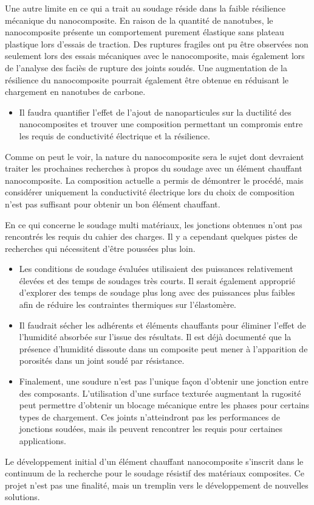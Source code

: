 Une autre limite en ce qui a trait au soudage réside dans la faible résilience mécanique du nanocomposite. 
En raison de la quantité de nanotubes, le nanocomposite présente un comportement purement élastique sans plateau plastique lors d'essais de traction. 
Des ruptures fragiles ont pu être observées non seulement lors des essais mécaniques avec le nanocomposite, mais également lors de l'analyse des faciès de rupture des joints soudés. 
Une augmentation de la résilience du nanocomposite pourrait également être obtenue en réduisant le chargement en nanotubes de carbone. 

\begin{itemize}
	\item Il faudra quantifier l'effet de l'ajout de nanoparticules sur la ductilité des nanocomposites et trouver une composition permettant un compromis entre les requis de conductivité électrique et la résilience. 
\end{itemize}

Comme on peut le voir, la nature du nanocomposite sera le sujet dont devraient traiter les prochaines recherches à propos du soudage avec un élément chauffant nanocomposite. 
La composition actuelle a permis de démontrer le procédé, mais considérer uniquement la conductivité électrique lors du choix de composition n'est pas suffisant pour obtenir un bon élément chauffant.

En ce qui concerne le soudage multi matériaux, les jonctions obtenues n'ont pas rencontrés les requis du cahier des charges. 
Il y a cependant quelques pistes de recherches qui nécessitent d'être poussées plus loin. 

\begin{itemize}
	\item Les conditions de soudage évaluées utilisaient des puissances relativement élevées et des temps de soudages très courts. 
	Il serait également approprié d'explorer des temps de soudage plus long avec des puissances plus faibles afin de réduire les contraintes thermiques sur l'élastomère. 
	\item Il faudrait sécher les adhérents et éléments chauffants pour éliminer l'effet de l'humidité absorbée sur l'issue des résultats. 
	Il est déjà documenté que la présence d'humidité dissoute dans un composite peut mener à l'apparition de porosités dans un joint soudé par résistance. 
	\item Finalement, une soudure n'est pas l'unique façon d'obtenir une jonction entre des composants. 
	L'utilisation d'une surface texturée augmentant la rugosité peut permettre d'obtenir un blocage mécanique entre les phases pour certains types de chargement. 
	Ces joints n'atteindront pas les performances de jonctions soudées, mais ils peuvent rencontrer les requis pour certaines applications. 
\end{itemize}

Le développement initial d'un élément chauffant nanocomposite s'inscrit dans le continuum de la recherche pour le soudage résistif des matériaux composites. 
Ce projet n'est pas une finalité, mais un tremplin vers le développement de nouvelles solutions. 